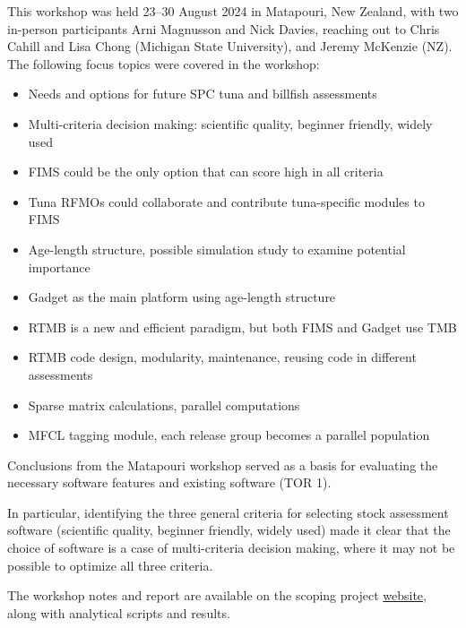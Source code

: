 \documentclass{SCreport}
\newcommand\tree
{https://github.com/PacificCommunity/ofp-sam-transition-plan/tree/main}
\begin{document}
\vspace{1ex}

This workshop was held 23--30 August 2024 in Matapouri, New Zealand, with two
in-person participants Arni Magnusson and Nick Davies, reaching out to Chris
Cahill and Lisa Chong (Michigan State University), and Jeremy McKenzie (NZ). The
following focus topics were covered in the workshop:

\begin{itemize}
  \item Needs and options for future SPC tuna and billfish assessments
  \item Multi-criteria decision making: scientific quality, beginner friendly,
  widely used
  \item FIMS could be the only option that can score high in all criteria
  \item Tuna RFMOs could collaborate and contribute tuna-specific modules to
  FIMS
  \item Age-length structure, possible simulation study to examine potential
  importance
  \item Gadget as the main platform using age-length structure
  \item RTMB is a new and efficient paradigm, but both FIMS and Gadget use TMB
  \item RTMB code design, modularity, maintenance, reusing code in different
  assessments
  \item Sparse matrix calculations, parallel computations
  \item MFCL tagging module, each release group becomes a parallel population
\end{itemize}

\vspace{1ex}

Conclusions from the Matapouri workshop served as a basis for evaluating the
necessary software features and existing software (TOR 1).

In particular, identifying the three general criteria for selecting stock
assessment software (scientific quality, beginner friendly, widely used) made it
clear that the choice of software is a case of multi-criteria decision making,
where it may not be possible to optimize all three criteria.

The workshop notes and report are available on the scoping project
\href{\tree/workshops/2024-08-matapouri}{website}, along with analytical scripts
and results.

\vspace{2ex}
\end{document}
